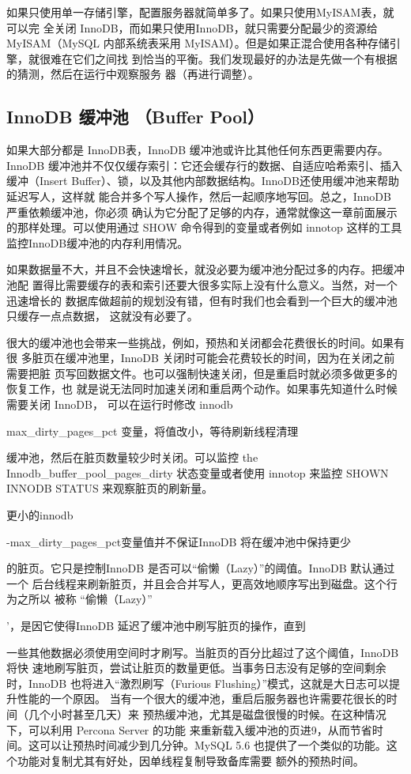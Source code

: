 如果只使用单一存储引擎，配置服务器就简单多了。如果只使用MyISAM表，就可以完
全关闭 InnoDB，而如果只使用InnoDB，就只需要分配最少的资源给 MyISAM（MySQL
内部系统表采用 MyISAM）。但是如果正混合使用各种存储引擎，就很难在它们之间找
到恰当的平衡。我们发现最好的办法是先做一个有根据的猜测，然后在运行中观察服务
器（再进行调整）。

\subsection{InnoDB 缓冲池 （Buffer Pool）}
如果大部分都是 InnoDB表，InnoDB 缓冲池或许比其他任何东西更需要内存。InnoDB
缓冲池并不仅仅缓存索引：它还会缓存行的数据、自适应哈希索引、插入缓冲（Insert
Buffer）、锁，以及其他内部数据结构。InnoDB还使用缓冲池来帮助延迟写人，这样就
能合并多个写人操作，然后一起顺序地写回。总之，InnoDB 严重依赖缓冲池，你必须
确认为它分配了足够的内存，通常就像这一章前面展示的那样处理。可以使用通过 SHOW
命令得到的变量或者例如 innotop 这样的工具监控InnoDB缓冲池的内存利用情况。

如果数据量不大，并且不会快速增长，就没必要为缓冲池分配过多的内存。把缓冲池配
置得比需要缓存的表和索引还要大很多实际上没有什么意义。当然，对一个迅速增长的
数据库做超前的规划没有错，但有时我们也会看到一个巨大的缓冲池只缓存一点点数据，
这就没有必要了。

很大的缓冲池也会带来一些挑战，例如，预热和关闭都会花费很长的时间。如果有很
多脏页在缓冲池里，InnoDB 关闭时可能会花费较长的时间，因为在关闭之前需要把脏
页写回数据文件。也可以强制快速关闭，但是重启时就必须多做更多的恢复工作，也
就是说无法同时加速关闭和重启两个动作。如果事先知道什么时候需要关闭 InnoDB，
可以在运行时修改 innodb

max\_dirty\_pages\_pct 变量，将值改小，等待刷新线程清理

缓冲池，然后在脏页数量较少时关闭。可以监控 the Innodb\_buffer\_pool\_pages\_dirty
状态变量或者使用 innotop 来监控 SHOWN INNODB STATUS 来观察脏页的刷新量。

更小的innodb

-max\_dirty\_pages\_pct变量值并不保证InnoDB 将在缓冲池中保持更少

的脏页。它只是控制InnoDB 是否可以“偷懒（Lazy）”的阈值。InnoDB 默认通过一个
后台线程来刷新脏页，并且会合并写人，更高效地顺序写出到磁盘。这个行为之所以
被称 “偷懒（Lazy）”

’，是因它使得InnoDB 延迟了缓冲池中刷写脏页的操作，直到

一些其他数据必须使用空间时才刷写。当脏页的百分比超过了这个阈值，InnoDB 将快
速地刷写脏页，尝试让脏页的数量更低。当事务日志没有足够的空间剩余时，InnoDB
也将进入“激烈刷写（Furious Flushing）”模式，这就是大日志可以提升性能的一个原因。
当有一个很大的缓冲池，重启后服务器也许需要花很长的时间（几个小时甚至几天）来
预热缓冲池，尤其是磁盘很慢的时候。在这种情况下，可以利用 Percona Server 的功能
来重新载入缓冲池的页进9，从而节省时间。这可以让预热时间减少到几分钟。MySQL 5.6
也提供了一个类似的功能。这个功能对复制尤其有好处，因单线程复制导致备库需要
额外的预热时间。

